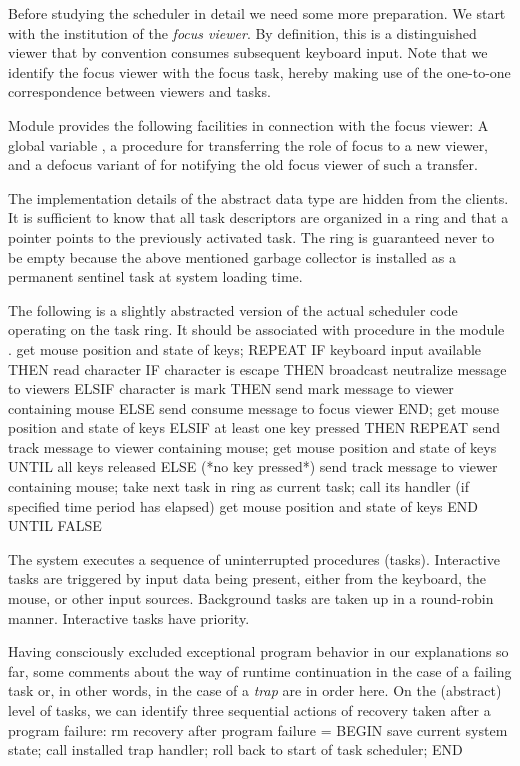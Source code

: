 Before studying the scheduler in detail we need some more
preparation. We start with the institution of the \emph{focus viewer}. By
definition, this is a distinguished viewer that by convention consumes
subsequent keyboard input. Note that we identify the focus viewer with
the focus task, hereby making use of the one-to-one correspondence
between viewers and tasks.

Module  provides the following facilities in connection with the
focus viewer: A global variable , a procedure  for
transferring the role of focus to a new viewer, and a defocus variant
of  for notifying the old focus viewer of such a transfer.

The implementation details of the abstract data type  are hidden
from the clients. It is sufficient to know that all task descriptors
are organized in a ring and that a pointer points to the previously
activated task. The ring is guaranteed never to be empty because the
above mentioned garbage collector is installed as a permanent sentinel
task at system loading time. %

The following is a slightly abstracted version of the actual scheduler
code operating on the task ring. It should be associated with
procedure  in the module .
\begintt
get mouse position and state of keys;
REPEAT
  IF keyboard input available THEN read character
    IF character is escape THEN
      broadcast neutralize message to viewers
    ELSIF character is mark THEN
      send mark message to viewer containing mouse
    ELSE send consume message to focus viewer
    END;
    get mouse position and state of keys
  ELSIF at least one key pressed THEN
    REPEAT
      send track message to viewer containing mouse;
      get mouse position and state of keys
    UNTIL all keys released
  ELSE (*no key pressed*)
    send track message to viewer containing mouse;
    take next task in ring as current task;
    call its handler (if specified time period has elapsed)
    get mouse position and state of keys
  END
UNTIL FALSE
\endtt

\noindent The system executes a sequence of uninterrupted procedures
(tasks). Interactive tasks are triggered by input data being present,
either from the keyboard, the mouse, or other input
sources. Background tasks are taken up in a round-robin
manner. Interactive tasks have priority.

Having consciously excluded exceptional program behavior in our
explanations so far, some comments about the way of runtime
continuation in the case of a failing task or, in other words, in the
case of a \emph{trap} are in order here. On the (abstract) level of tasks, we
can identify three sequential actions of recovery taken after a
program failure: %
\begintt
rm recovery after program failure =
BEGIN
  save current system state;
  call installed trap handler;
  roll back to start of task scheduler;
END
\endtt

